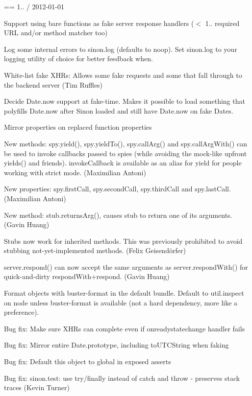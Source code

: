 == 1.. / 2012-\/01-\/01
\begin{DoxyItemize}
\item Support using bare functions as fake server response handlers ($<$ 1.. required U\+RL and/or method matcher too)
\item Log some internal errors to sinon.\+log (defaults to noop). Set sinon.\+log to your logging utility of choice for better feedback when.
\item White-\/list fake X\+H\+Rs\+: Allows some fake requests and some that fall through to the backend server (Tim Ruffles)
\item Decide Date.\+now support at fake-\/time. Makes it possible to load something that polyfills Date.\+now after Sinon loaded and still have Date.\+now on fake Dates.
\item Mirror properties on replaced function properties
\item New methods\+: spy.\+yield(), spy.\+yield\+To(), spy.\+call\+Arg() and spy.\+call\+Arg\+With() can be used to invoke callbacks passed to spies (while avoiding the mock-\/like upfront yields() and friends). invoke\+Callback is available as an alias for yield for people working with strict mode. (Maximilian Antoni)
\item New properties\+: spy.\+first\+Call, spy.\+second\+Call, spy.\+third\+Call and spy.\+last\+Call. (Maximilian Antoni)
\item New method\+: stub.\+returns\+Arg(), causes stub to return one of its arguments. (Gavin Huang)
\item Stubs now work for inherited methods. This was previously prohibited to avoid stubbing not-\/yet-\/implemented methods. (Felix Geisendörfer)
\item server.\+respond() can now accept the same arguments as server.\+respond\+With() for quick-\/and-\/dirty respond\+With+respond. (Gavin Huang)
\item Format objects with buster-\/format in the default bundle. Default to util.\+inspect on node unless buster-\/format is available (not a hard dependency, more like a \textquotesingle{}preference\textquotesingle{}).
\item Bug fix\+: Make sure X\+H\+Rs can complete even if onreadystatechange handler fails
\item Bug fix\+: Mirror entire Date.\+prototype, including to\+U\+T\+C\+String when faking
\item Bug fix\+: Default this object to global in exposed asserts
\item Bug fix\+: sinon.\+test\+: use try/finally instead of catch and throw -\/ preserves stack traces (Kevin Turner)

\end{DoxyItemize}
